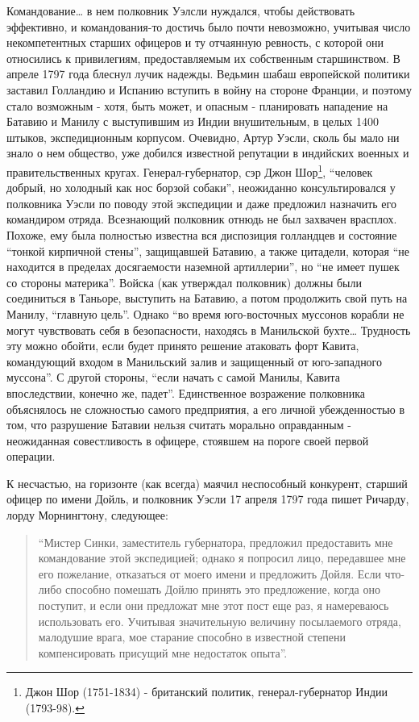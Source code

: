\documentclass[
  oneside,
  12pt,
  titlepage]{book}
\begin{document}
Командование\ldots{} в нем полковник Уэлсли нуждался, чтобы действовать эффективно, и командования-то достичь было почти невозможно, учитывая число некомпетентных старших офицеров и ту отчаянную ревность, с которой они относились к привилегиям, предоставляемым их собственным старшинством. В апреле 1797 года блеснул лучик надежды. Ведьмин шабаш европейской политики заставил Голландию и Испанию вступить в войну на стороне Франции, и поэтому стало возможным - хотя, быть может, и опасным - планировать нападение на Батавию и Манилу с выступившим из Индии внушительным, в целых 1400 штыков, экспедиционным корпусом. Очевидно, Артур Уэсли, сколь бы мало ни знало о нем общество, уже добился известной репутации в индийских военных и правительственных кругах. Генерал-губернатор, сэр Джон Шор\footnote{Джон Шор (1751-1834) - британский политик, генерал-губернатор Индии (1793-98).}, ``человек добрый, но холодный как нос борзой собаки'', неожиданно консультировался у полковника Уэсли по поводу этой экспедиции и даже предложил назначить его командиром отряда. Всезнающий полковник отнюдь не был захвачен врасплох. Похоже, ему была полностью известна вся диспозиция голландцев и состояние ``тонкой кирпичной стены'', защищавшей Батавию, а также цитадели, которая ``не находится в пределах досягаемости наземной артиллерии'', но ``не имеет пушек со стороны материка''. Войска (как утверждал полковник) должны были соединиться в Таньоре, выступить на Батавию, а потом продолжить свой путь на Манилу, ``главную цель''. Однако ``во время юго-восточных муссонов корабли не могут чувствовать себя в безопасности, находясь в Манильской бухте\ldots{} Трудность эту можно обойти, если будет принято решение атаковать форт Кавита, командующий входом в Манильский залив и защищенный от юго-западного муссона''. С другой стороны, ``если начать с самой Манилы, Кавита впоследствии, конечно же, падет''. Единственное возражение полковника объяснялось не сложностью самого предприятия, а его личной убежденностью в том, что разрушение Батавии нельзя считать морально оправданным - неожиданная совестливость в офицере, стоявшем на пороге своей первой операции.

К несчастью, на горизонте (как всегда) маячил неспособный конкурент, старший офицер по имени Дойль, и полковник Уэсли 17 апреля 1797 года пишет Ричарду, лорду Морнингтону, следующее:

\begin{quote}
``Мистер Синки, заместитель губернатора, предложил предоставить мне командование этой экспедицией; однако я попросил лицо, передавшее мне его пожелание, отказаться от моего имени и предложить Дойля. Если что-либо способно помешать Дойлю принять это предложение, когда оно поступит, и если они предложат мне этот пост еще раз, я намереваюсь использовать его. Учитывая значительную величину посылаемого отряда, малодушие врага, мое старание способно в известной степени компенсировать присущий мне недостаток опыта''.
\end{quote}
\end{document}
